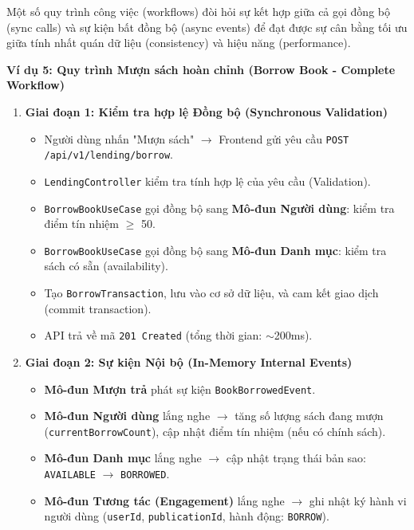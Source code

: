 Một số quy trình công việc (workflows) đòi hỏi sự kết hợp giữa cả gọi đồng bộ (sync calls) và sự kiện bất đồng bộ (async events) để đạt được sự cân bằng tối ưu giữa tính nhất quán dữ liệu (consistency) và hiệu năng (performance).

\textbf{Ví dụ 5: Quy trình Mượn sách hoàn chỉnh (Borrow Book - Complete Workflow)}

\begin{enumerate}
    \item \textbf{Giai đoạn 1: Kiểm tra hợp lệ Đồng bộ (Synchronous Validation)}
    \begin{itemize}
        \item Người dùng nhấn "Mượn sách" $\rightarrow$ Frontend gửi yêu cầu \texttt{POST /api/v1/lending/borrow}.
        \item \texttt{LendingController} kiểm tra tính hợp lệ của yêu cầu (Validation).
        \item \texttt{BorrowBookUseCase} gọi đồng bộ sang \textbf{Mô-đun Người dùng}: kiểm tra điểm tín nhiệm $\ge$ 50.
        \item \texttt{BorrowBookUseCase} gọi đồng bộ sang \textbf{Mô-đun Danh mục}: kiểm tra sách có sẵn (availability).
        \item Tạo \texttt{BorrowTransaction}, lưu vào cơ sở dữ liệu, và cam kết giao dịch (commit transaction).
        \item API trả về mã \texttt{201 Created} (tổng thời gian: $\sim$200ms).
    \end{itemize}
    
    \item \textbf{Giai đoạn 2: Sự kiện Nội bộ (In-Memory Internal Events)}
    \begin{itemize}
        \item \textbf{Mô-đun Mượn trả} phát sự kiện \texttt{BookBorrowedEvent}.
        \item \textbf{Mô-đun Người dùng} lắng nghe $\rightarrow$ tăng số lượng sách đang mượn (\texttt{currentBorrowCount}), cập nhật điểm tín nhiệm (nếu có chính sách).
        \item \textbf{Mô-đun Danh mục} lắng nghe $\rightarrow$ cập nhật trạng thái bản sao: \texttt{AVAILABLE} $\rightarrow$ \texttt{BORROWED}.
        \item \textbf{Mô-đun Tương tác (Engagement)} lắng nghe $\rightarrow$ ghi nhật ký hành vi người dùng (\texttt{userId}, \texttt{publicationId}, hành động: \texttt{BORROW}).
    \end{itemize}
    

\end{enumerate}
